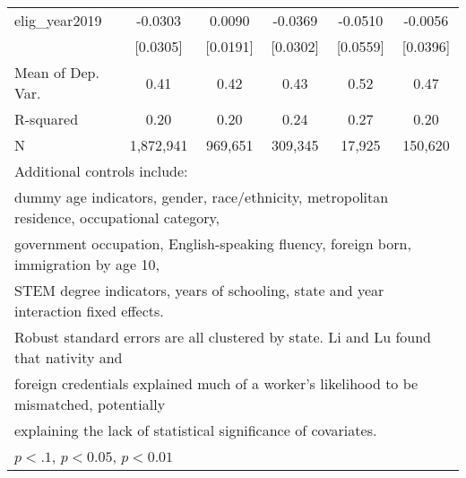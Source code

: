 \begin{table}[htbp]
\begin{tabular}{l*{5}{c}}
\addlinespace
elig\_year2019       &     -0.0303         &      0.0090         &     -0.0369         &     -0.0510         &     -0.0056         \\
                    &    [0.0305]         &    [0.0191]         &    [0.0302]         &    [0.0559]         &    [0.0396]         \\
\midrule
Mean of Dep. Var.   &        0.41         &        0.42         &        0.43         &        0.52         &        0.47         \\
R-squared           &        0.20         &        0.20         &        0.24         &        0.27         &        0.20         \\
N                   &   1,872,941         &     969,651         &     309,345         &      17,925         &     150,620         \\
\bottomrule
\multicolumn{6}{l}{\footnotesize Additional controls include:}\\
\multicolumn{6}{l}{\footnotesize dummy age indicators, gender, race/ethnicity, metropolitan residence, occupational category,}\\
\multicolumn{6}{l}{\footnotesize government occupation, English-speaking fluency, foreign born, immigration by age 10,}\\
\multicolumn{6}{l}{\footnotesize STEM degree indicators, years of schooling, state and year interaction fixed effects.}\\
\multicolumn{6}{l}{\footnotesize Robust standard errors are all clustered by state. Li and Lu found that nativity and}\\
\multicolumn{6}{l}{\footnotesize foreign credentials explained much of a worker's likelihood to be mismatched, potentially}\\
\multicolumn{6}{l}{\footnotesize explaining the lack of statistical significance of covariates.}\\
\multicolumn{6}{l}{\footnotesize \sym{*} \(p<.1\), \sym{**} \(p<0.05\), \sym{***} \(p<0.01\)}\\
\end{tabular}
\end{table}
